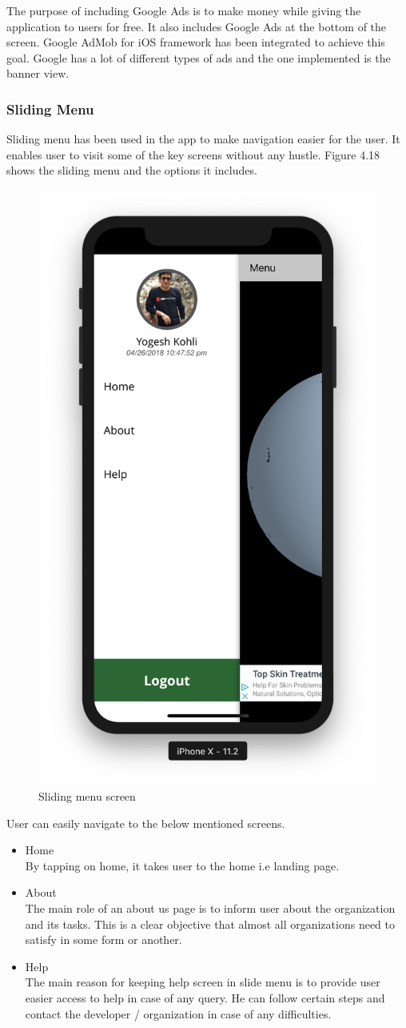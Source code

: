     The purpose of including Google Ads is to make money while giving the application to users for free. It also includes Google Ads at the bottom of the screen. Google AdMob for \gls{iOS} framework has been integrated to achieve this goal. Google has a lot of different types of ads and the one implemented is the banner view.

\subsubsection{Sliding Menu}

Sliding menu has been used in the app to make navigation easier for the user. It enables user to visit some of the key screens without any hustle. Figure 4.18 shows the sliding menu and the options it includes.

    \begin{figure}[H]
            \centering
            \includegraphics[width=0.25\linewidth]{figures/ch4/side_menu.png}
            \caption{\label{fig:side_menu_ch4} Sliding menu screen}
    \end{figure}

    User can easily navigate to the below mentioned screens.

    \begin{itemize}
    \item Home \\
    By tapping on home, it takes user to the home i.e landing page.
    
        \item About \\
            The main role of an about us page is to inform user about the organization and its tasks. This is a clear objective that almost all organizations need to satisfy in some form or another.
    
         \item Help \\
            The main reason for keeping help screen in slide menu is to provide user easier access to help in case of any query. He can follow certain steps and contact the developer / organization in case of any difficulties.
            
    \end{itemize}

